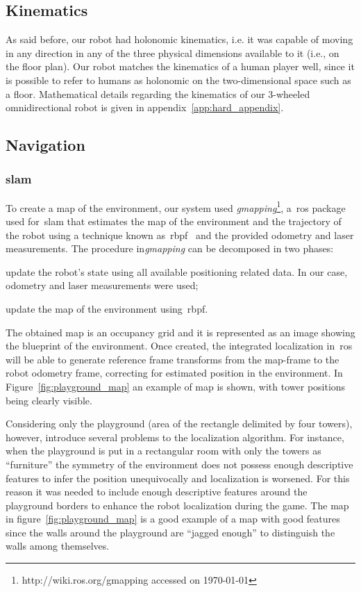 \subsection{Kinematics}
As said before, our robot had holonomic kinematics, i.e. it was capable of moving in any direction in any of the three physical dimensions available to it (i.e., on the floor plan). Our robot matches the kinematics of a human player well, since it is possible to refer to humans as holonomic on the two-dimensional space such as a floor. Mathematical details regarding the kinematics of our 3-wheeled omnidirectional robot is given in appendix~\ref{app:hard_appendix}.

\subsection{Navigation}\label{sec:navigation}
\subsubsection{\glsdesc{slam}}\label{gmapping}
To create a map of the environment, our system used \textit{gmapping}\footnote{http://wiki.ros.org/gmapping accessed on \today}, a~\gls{ros} package used for~\gls{slam} that estimates the map of the environment and the trajectory of the robot using a technique known as~\gls{rbpf}~\citep{grisettiyz_improving_2005} and the provided odometry and laser measurements. The procedure in\textit{gmapping} can be decomposed in two phases: \begin{inparaenum}\item update the robot's state using all available positioning related data. In our case, odometry and laser measurements were used; \item update the map of the environment using~\gls{rbpf}.\end{inparaenum}

The obtained map is an occupancy grid and it is represented as an image showing the blueprint of the environment. Once created, the integrated localization in~\gls{ros} will be able to generate reference frame transforms from the map-frame to the robot odometry frame, correcting for estimated position in the environment. In Figure~\ref{fig:playground_map} an example of map is shown, with tower positions being clearly visible.

Considering only the playground (area of the rectangle delimited by four towers), however, introduce several problems to the localization algorithm. For instance, when the playground is put in a rectangular room with only the towers as ``furniture'' the symmetry of the environment does not possess enough descriptive features to infer the position unequivocally and localization is worsened. For this reason it was needed to include enough descriptive features around the playground borders to enhance the robot localization during the game. The map in figure~\ref{fig:playground_map} is a good example of a map with good features since the walls around the playground are ``jagged enough'' to distinguish the walls among themselves. 

